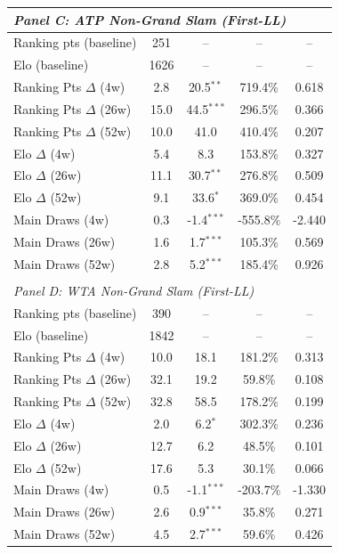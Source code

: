 \begin{tabular}{lcccc}
\\[0.5em]
\multicolumn{5}{l}{\textit{Panel C: ATP Non-Grand Slam (First-LL)}} \\
\midrule
Ranking pts (baseline) & 251 & -- & -- & -- \\
Elo (baseline) & 1626 & -- & -- & -- \\[0.3em]
\quad Ranking Pts $\Delta$ (4w) & 2.8 & 20.5$^{**}$ & 719.4\% & 0.618 \\
\quad Ranking Pts $\Delta$ (26w) & 15.0 & 44.5$^{***}$ & 296.5\% & 0.366 \\
\quad Ranking Pts $\Delta$ (52w) & 10.0 & 41.0 & 410.4\% & 0.207 \\

\quad Elo $\Delta$ (4w) & 5.4 & 8.3 & 153.8\% & 0.327 \\
\quad Elo $\Delta$ (26w) & 11.1 & 30.7$^{**}$ & 276.8\% & 0.509 \\
\quad Elo $\Delta$ (52w) & 9.1 & 33.6$^{*}$ & 369.0\% & 0.454 \\

\quad Main Draws (4w) & 0.3 & -1.4$^{***}$ & -555.8\% & -2.440 \\
\quad Main Draws (26w) & 1.6 & 1.7$^{***}$ & 105.3\% & 0.569 \\
\quad Main Draws (52w) & 2.8 & 5.2$^{***}$ & 185.4\% & 0.926 \\

\\[0.5em]
\multicolumn{5}{l}{\textit{Panel D: WTA Non-Grand Slam (First-LL)}} \\
\midrule
Ranking pts (baseline) & 390 & -- & -- & -- \\
Elo (baseline) & 1842 & -- & -- & -- \\[0.3em]
\quad Ranking Pts $\Delta$ (4w) & 10.0 & 18.1 & 181.2\% & 0.313 \\
\quad Ranking Pts $\Delta$ (26w) & 32.1 & 19.2 & 59.8\% & 0.108 \\
\quad Ranking Pts $\Delta$ (52w) & 32.8 & 58.5 & 178.2\% & 0.199 \\

\quad Elo $\Delta$ (4w) & 2.0 & 6.2$^{*}$ & 302.3\% & 0.236 \\
\quad Elo $\Delta$ (26w) & 12.7 & 6.2 & 48.5\% & 0.101 \\
\quad Elo $\Delta$ (52w) & 17.6 & 5.3 & 30.1\% & 0.066 \\

\quad Main Draws (4w) & 0.5 & -1.1$^{***}$ & -203.7\% & -1.330 \\
\quad Main Draws (26w) & 2.6 & 0.9$^{***}$ & 35.8\% & 0.271 \\
\quad Main Draws (52w) & 4.5 & 2.7$^{***}$ & 59.6\% & 0.426 \\

\bottomrule
\end{tabular}
